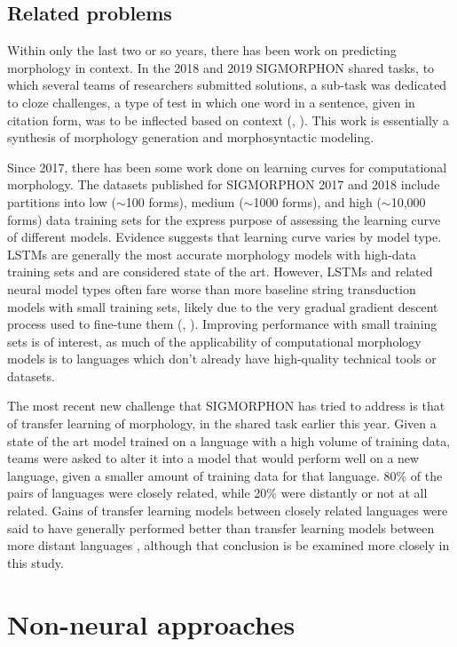 \subsection{Related problems}

Within only the last two or so years, there has been work on predicting morphology in context. In the 2018 and 2019 SIGMORPHON shared tasks, to which several teams of researchers submitted solutions, a sub-task was dedicated to cloze challenges, a type of test in which one word in a sentence, given in citation form, was to be inflected based on context (\cite{Cotterell2018b}, \cite{McCarthy2019}). This work is essentially a synthesis of morphology generation and morphosyntactic modeling.

Since 2017, there has been some work done on learning curves for computational morphology. The datasets published for SIGMORPHON 2017 and 2018 include partitions into low ($\sim$100 forms), medium ($\sim$1000 forms), and high ($\sim$10,000 forms) data training sets for the express purpose of assessing the learning curve of different models. Evidence suggests that learning curve varies by model type. LSTMs are generally the most accurate morphology models with high-data training sets and are considered state of the art. However, LSTMs and related neural model types often fare worse than more baseline string transduction models with small training sets, likely due to the very gradual gradient descent process used to fine-tune them (\cite{Cotterell2017a}, \cite{Cotterell2018b}). Improving performance with small training sets is of interest, as much of the applicability of computational morphology models is to languages which don't already have high-quality technical tools or datasets. 

The most recent new challenge that SIGMORPHON has tried to address is that of transfer learning of morphology, in the shared task earlier this year. Given a state of the art model trained on a language with a high volume of training data, teams were asked to alter it into a model that would perform well on a new language, given a smaller amount of training data for that language. 80\% of the pairs of languages were closely related, while 20\% were distantly or not at all related. Gains of transfer learning models between closely related languages were said to have generally performed better than transfer learning models between more distant languages \parencite{McCarthy2019}, although that conclusion is be examined more closely in this study.

\section{Non-neural approaches}

